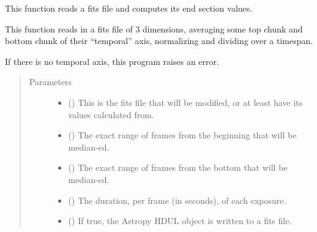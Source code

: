 \documentclass[letterpaper,10pt,english]{sphinxmanual}
\begin{document}
\begin{fulllineitems}
\label{\detokenize{python_docstrings/IfA_Smeargle.bravo.averaging:IfA_Smeargle.bravo.averaging.average_endpoints_per_second}}
This function reads a fits file and computes its end section values.

This function reads in a fits file of 3 dimensions, averaging some
top chunk and bottom chunk of their “temporal” axis, normalizing
and dividing over a timespan.

If there is no temporal axis, this program raises an error.
\begin{quote}\begin{description}
\item[{Parameters}] \leavevmode\begin{itemize}
\item {} 
 () \textendash{} This is the fits file that will be modified, or at least have its
values calculated from.

\item {} 
 () \textendash{} The exact range of frames from the beginning that will be median-ed.

\item {} 
 () \textendash{} The exact range of frames from the bottom that will be median-ed.

\item {} 
 () \textendash{} The duration, per frame (in seconds), of each exposure.

\item {} 
 (\sphinxstyleliteralemphasis{\sphinxupquote{ (}}\sphinxstyleliteralemphasis{\sphinxupquote{)}}) \textendash{} If true, the Astropy HDUL object is written to a fits file.


\end{itemize}
\end{description}
\end{quote}
\end{fulllineitems}
\end{document}
